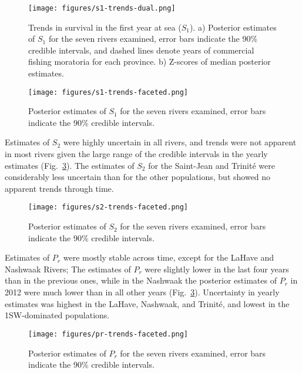 \documentclass[12pt]{article}
\newcommand{\So}{$S_{1}$\xspace}
\newcommand{\St}{$S_{2}$\xspace}
\newcommand{\Pg}{$P_r$\xspace}
\begin{document}
\begin{figure}[htbp] \centering
    \texttt{[image: figures/s1-trends-dual.png]}
    \caption{Trends in survival in the first year at sea (\So). a) Posterior
        estimates of \So for the seven rivers examined, error bars indicate
        the 90\% credible intervals, and dashed lines denote years of commercial
        fishing moratoria for each province. b) Z-scores of median posterior
        estimates.} \label{fig:s1-dual} \end{figure}

\begin{figure}[htbp] \centering
    \texttt{[image: figures/s1-trends-faceted.png]}
    \caption{Posterior estimates of \So for the seven rivers examined, error
        bars indicate the 90\% credible intervals.} \label{fig:s1-faceted}
\end{figure}

Estimates of \St were highly uncertain in all rivers, and trends 
were not apparent in most rivers given the large range of the credible
intervals in the yearly estimates (Fig.~\ref{fig:s2-faceted}). The estimates
of \St for the Saint-Jean and Trinit\'{e} were considerably less uncertain
than for the other populations, but showed no apparent trends through time.

\begin{figure}[htbp] \centering
    \texttt{[image: figures/s2-trends-faceted.png]}
    \caption{Posterior estimates of \St for the seven rivers examined, error
        bars indicate the 90\% credible intervals.} \label{fig:s2-faceted}
\end{figure}

Estimates of \Pg were mostly stable across time, except for the LaHave and
Nashwaak Rivers; The estimates of \Pg were slightly lower in the last four
years than in the previous ones, while in the Nashwaak the posterior estimates
of \Pg in 2012 were much lower than in all other years
(Fig.~\ref{fig:s2-faceted}). Uncertainty in yearly estimates was highest in
the LaHave, Nashwaak, and Trinit\'{e}, and lowest in the 1SW-dominated
populations.

\begin{figure}[htbp] \centering
    \texttt{[image: figures/pr-trends-faceted.png]}
    \caption{Posterior estimates of \Pg for the seven rivers examined, error
        bars indicate the 90\% credible intervals.} \label{fig:pr-faceted}
\end{figure}
\end{document}
